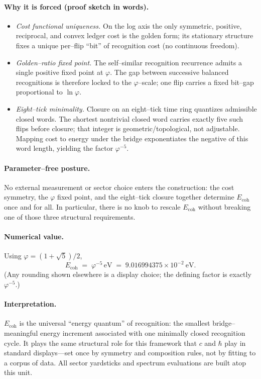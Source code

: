\documentclass[epjc3]{svjour3}
\begin{document}
\paragraph{Why it is forced (proof sketch in words).}
\begin{itemize}
  \item \emph{Cost functional uniqueness.} On the log axis the only symmetric, positive, reciprocal, and convex ledger cost is the golden form; its stationary structure fixes a unique per–flip “bit” of recognition cost (no continuous freedom).
  \item \emph{Golden–ratio fixed point.} The self–similar recognition recurrence admits a single positive fixed point at $\varphi$. The gap between successive balanced recognitions is therefore locked to the $\varphi$–scale; one flip carries a fixed bit–gap proportional to $\ln\varphi$.
  \item \emph{Eight–tick minimality.} Closure on an eight–tick time ring quantizes admissible closed words. The shortest nontrivial closed word carries exactly five such flips before closure; that integer is geometric/topological, not adjustable. Mapping cost to energy under the bridge exponentiates the negative of this word length, yielding the factor $\varphi^{-5}$.
\end{itemize}

\paragraph{Parameter–free posture.}
No external measurement or sector choice enters the construction: the cost symmetry, the $\varphi$ fixed point, and the eight–tick closure together determine $E_{\mathrm{coh}}$ once and for all. In particular, there is no knob to rescale $E_{\mathrm{coh}}$ without breaking one of those three structural requirements.

\paragraph{Numerical value.}
Using $\varphi=(1+\sqrt{5})/2$,
\[
E_{\mathrm{coh}} \;=\; \varphi^{-5}\,\mathrm{eV}
\;=\; 9.016994375\times 10^{-2}\ \mathrm{eV}.
\]
(Any rounding shown elsewhere is a display choice; the defining factor is exactly $\varphi^{-5}$.)

\paragraph{Interpretation.}
$E_{\mathrm{coh}}$ is the universal “energy quantum” of recognition: the smallest bridge–meaningful energy increment associated with one minimally closed recognition cycle. It plays the same structural role for this framework that $c$ and $\hbar$ play in standard displays—set once by symmetry and composition rules, not by fitting to a corpus of data. All sector yardsticks and spectrum evaluations are built atop this unit.
\end{document}
